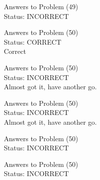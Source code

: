 \documentclass[11pt]{article}
\begin{document}
\begin{minipage}[t]{0.5\textwidth}
  {\centering
  
  Answers to Problem (49)\\
  Status: INCORRECT\\
  
  }
\end{minipage}
\begin{minipage}[t]{0.5\textwidth}
  {\centering
  
  Answers to Problem (50)\\
  Status: CORRECT\\
  Correct\\
  }
\end{minipage}
\begin{minipage}[t]{0.5\textwidth}
  {\centering
  
  Answers to Problem (50)\\
  Status: INCORRECT\\
  Almost got it, have another go.\\
  }
\end{minipage}
\begin{minipage}[t]{0.5\textwidth}
  {\centering
  
  Answers to Problem (50)\\
  Status: INCORRECT\\
  Almost got it, have another go.\\
  }
\end{minipage}
\begin{minipage}[t]{0.5\textwidth}
  {\centering
  
  Answers to Problem (50)\\
  Status: INCORRECT\\
  
  }
\end{minipage}
\begin{minipage}[t]{0.5\textwidth}
  {\centering
  
  Answers to Problem (50)\\
  Status: INCORRECT\\
  
  }
\end{minipage}
\end{document}
